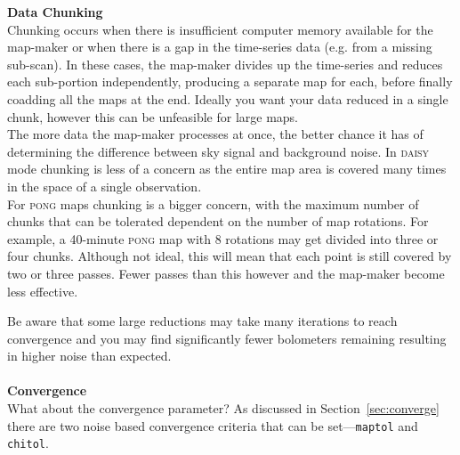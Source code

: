 \documentclass[twoside,11pt]{article}
\newcommand{\htmlref}[2]{#1}
\newenvironment{latexonly}{}{}
\newcommand{\latexhtml}[2]{#1}
\renewcommand{\_}{\texttt{\symbol{95}}}
\newenvironment{fmpage}[1]{\begin{lrbox}{\fmbox}\begin{minipage}{#1}}{\end{minipage}\end{lrbox}\fbox{\usebox{\fmbox}}}
\newcommand{\cref}[3]{\latexhtml{#1~\ref{#2}}{\htmlref{#3}{#2}}}
\begin{document}
\begin{latexonly}
\begin{center}
\begin{fmpage}{0.92\linewidth}
\label{page:text}
\begin{minipage}[t!]{0.025\linewidth}
\hspace{0.1cm}
\end{minipage}
\begin{minipage}[t!]{0.93\linewidth}
\vspace{0.2cm}
\textbf{Data Chunking}\\
Chunking occurs when there is insufficient computer memory available
for the map-maker or when there is a gap in the time-series data (e.g.
from a missing sub-scan). In these cases, the map-maker divides up the
time-series and reduces each sub-portion independently, producing a
separate map for each, before finally coadding all the maps at the
end. Ideally you want your data reduced in a single chunk, however
this can be unfeasible for large maps.
\vspace{0.2cm}\\
The more data the map-maker processes at once, the better chance it
has of determining the difference between sky signal and background
noise. In \textsc{daisy} mode chunking is less of a concern as
the entire map area is covered many times in the space of a single
observation.
\vspace{0.2cm}\\
For \textsc{pong} maps chunking is a bigger concern, with the
maximum number of chunks that can be tolerated dependent on the number
of map rotations. For example, a 40-minute \textsc{pong} map with 8
rotations may get divided into three or four chunks. Although not
ideal, this will mean that each point is still covered by two or three
passes. Fewer passes than this however and the map-maker become less
effective.
\vspace{0.2cm}
\end{minipage}
\begin{minipage}[t!]{0.025\linewidth}
\hspace{0.1cm}
\end{minipage}
\end{fmpage}
\end{center}
\end{latexonly}

Be aware that some large reductions may take many iterations to reach
convergence and you may find significantly fewer bolometers remaining
resulting in higher noise than expected.
\\ \\
\textbf{Convergence}\\
What about the convergence parameter? As discussed in
\cref{Section}{sec:converge}{Convergence} there are two noise based
convergence criteria that can be set---\texttt{maptol} and \texttt{chitol}.
\end{document}
